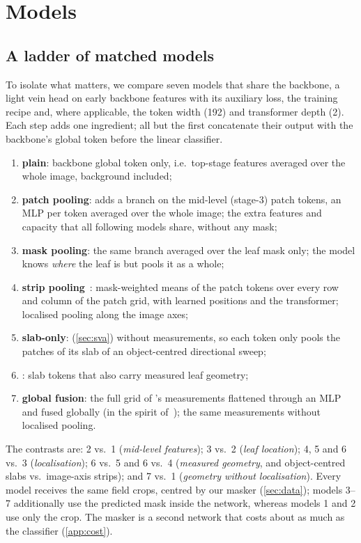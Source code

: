 \section{Models}
\label{sec:method}

\subsection{A ladder of matched models}
\label{sec:controls}
To isolate what matters, we compare seven models that share the backbone, a light vein head on early
backbone features with its auxiliary loss, the training recipe and, where applicable, the token width
(192) and transformer depth (2). Each step adds one ingredient; all but the first concatenate their
output with the backbone's global token before the linear classifier.
\begin{enumerate}
 \item \textbf{plain}: backbone global token only, i.e.\ top-stage features averaged over the whole
   image, background included;
 \item \textbf{patch pooling}: adds a branch on the mid-level (stage-3) patch tokens, an MLP per token
   averaged over the whole image; the extra features and capacity that all following models share,
   without any mask;
 \item \textbf{mask pooling}: the same branch averaged over the leaf mask only; the model knows
   \emph{where} the leaf is but pools it as a whole;
 \item \textbf{strip pooling}~\citep{hou2020strip}: mask-weighted means of the patch tokens over every
   row and column of the patch grid, with learned positions and the transformer; localised pooling along
   the image axes;
 \item \textbf{slab-only}: \SVA{} (\cref{sec:sva}) without measurements, so each token only pools the
   patches of its slab of an object-centred directional sweep;
 \item \textbf{\SVA{}}: slab tokens that also carry measured leaf geometry;
 \item \textbf{global fusion}: the full grid of \SVA{}'s measurements flattened through an MLP and fused
   globally (in the spirit of~\citep{phgnet2023,gu2026multifiltration}); the same measurements without
   localised pooling.
\end{enumerate}
The contrasts are: 2 vs.\ 1 (\emph{mid-level features}); 3 vs.\ 2 (\emph{leaf location}); 4, 5 and 6
vs.\ 3 (\emph{localisation}); 6 vs.\ 5 and 6 vs.\ 4 (\emph{measured geometry}, and object-centred slabs
vs.\ image-axis strips); and 7 vs.\ 1 (\emph{geometry without localisation}). Every model receives the
same field crops, centred by our masker (\cref{sec:data}); models 3--7 additionally use the predicted
mask inside the network, whereas models 1 and 2 use only the crop. The masker is a second network that
costs about as much as the classifier (\cref{app:cost}).

